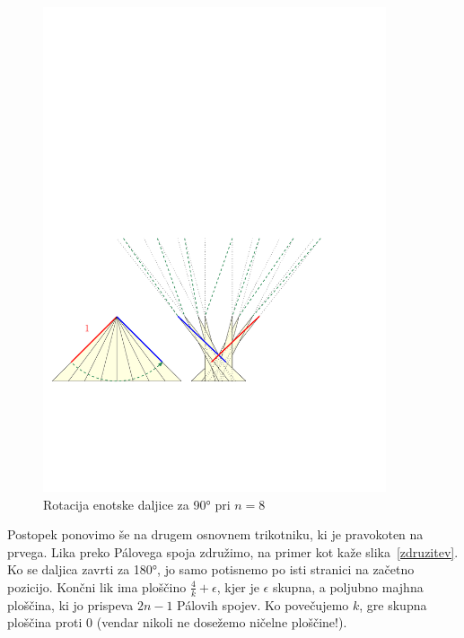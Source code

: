 \documentclass[a4paper, 12pt]{article}
\begin{document}
\begin{figure}[h!]
    \centering
    \includegraphics[width=0.9\textwidth]{ipe_slike/prehod_drevo1.pdf}
    \caption{Rotacija enotske daljice za 90° pri $ n = 8 $}
    \label{prehodi}
\end{figure}

Postopek ponovimo še na drugem osnovnem trikotniku, ki je pravokoten na prvega. Lika preko Pálovega spoja združimo, na primer kot kaže slika~\ref{zdruzitev}. Ko se daljica zavrti za 180°, jo samo potisnemo po isti stranici na začetno pozicijo. Končni lik ima ploščino $ \frac{4}{k} + \epsilon $, kjer je $ \epsilon $ skupna, a poljubno majhna ploščina, ki jo prispeva $ 2n - 1 $ Pálovih spojev. Ko povečujemo $ k $, gre skupna ploščina proti 0 (vendar nikoli ne dosežemo ničelne ploščine!).
\end{document}
